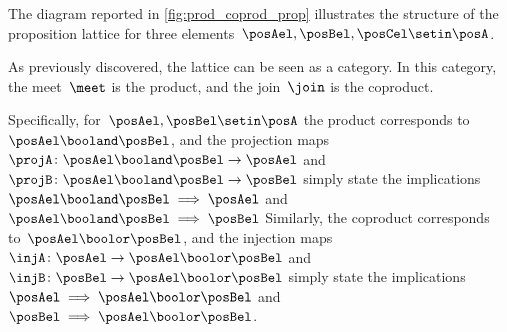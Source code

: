 The diagram reported in \cref{fig:prod_coprod_prop} illustrates the structure of the proposition lattice for three elements~$\posAel,\posBel,\posCel\setin \posA$.

As previously discovered, the lattice can be seen as a category.
In this category, the meet~$\meet$ is the product, and the join~$\join$ is the coproduct.

Specifically, for~$\posAel,\posBel\setin \posA$ the product corresponds to~$\posAel\booland \posBel$, and the projection maps~$\projA\colon \posAel\booland \posBel\to \posAel$ and~$\projB\colon \posAel\booland \posBel\to \posBel$ simply state the implications~$\posAel \booland \posBel \implies \posAel$ and~$\posAel \booland \posBel \implies \posBel$
Similarly, the coproduct corresponds to~$\posAel\boolor \posBel$, and the injection maps~$\injA\colon \posAel\to \posAel\boolor \posBel$ and~$\injB\colon \posBel\to \posAel\boolor \posBel$ simply state the implications~$\posAel \implies \posAel \boolor \posBel$ and~$\posBel \implies \posAel \boolor \posBel$.
